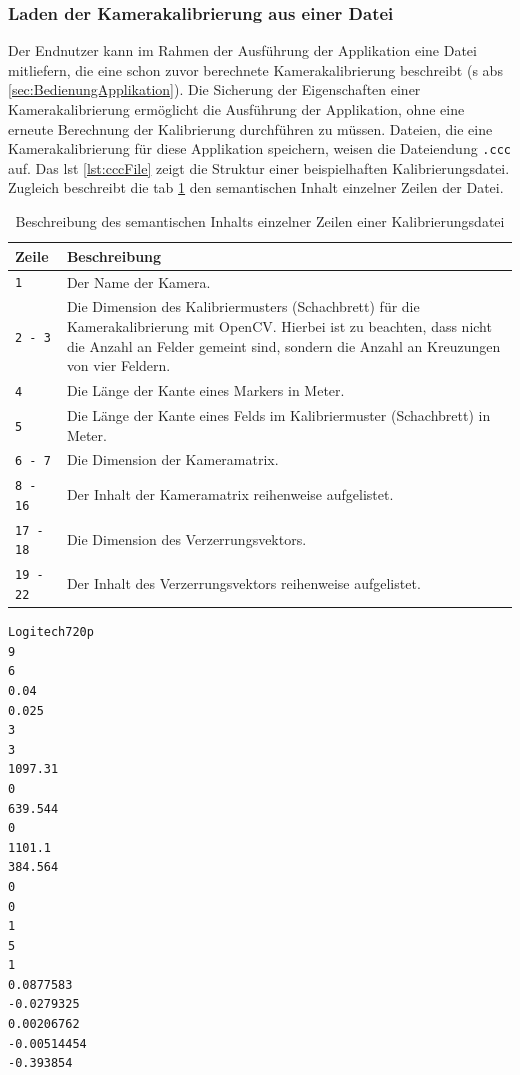 \subsubsection{Laden der Kamerakalibrierung aus einer Datei}\label{sssec:lokalfile}
Der Endnutzer kann im Rahmen der Ausführung der Applikation eine Datei mitliefern, die eine schon zuvor berechnete Kamerakalibrierung beschreibt (\acs{s} \acs{abs} \ref{sec:BedienungApplikation}). Die Sicherung der Eigenschaften einer Kamerakalibrierung ermöglicht die Ausführung der Applikation, ohne eine erneute Berechnung der Kalibrierung durchführen zu müssen. Dateien, die eine Kamerakalibrierung für diese Applikation speichern, weisen die Dateiendung \grqq \texttt{.ccc}\grqq{} auf. Das \acs{lst} \ref{lst:cccFile} zeigt die Struktur einer beispielhaften Kalibrierungsdatei. Zugleich beschreibt die \acs{tab} \ref{tab:cccFile} den semantischen Inhalt einzelner Zeilen der Datei.

\begin{table}[H]
\centering
\begin{tabular}{|p{3cm}|p{12cm}|}
\hline
\textbf{Zeile} & \textbf{Beschreibung} \\
\hline
\verb|1| & Der Name der Kamera.\\
\hline
\verb|2 - 3| & Die Dimension des Kalibriermusters (Schachbrett) für die Kamerakalibrierung mit OpenCV. Hierbei ist zu beachten, dass nicht die Anzahl an Felder gemeint sind, sondern die Anzahl an Kreuzungen von vier Feldern.\\
\hline
\verb|4| & Die Länge der Kante eines Markers in Meter.\\
\hline
\verb|5| & Die Länge der Kante eines Felds im Kalibriermuster (Schachbrett) in Meter.\\
\hline
\verb|6 - 7| & Die Dimension der Kameramatrix.\\
\hline
\verb|8 - 16| & Der Inhalt der Kameramatrix reihenweise aufgelistet.\\
\hline
\verb|17 - 18| & Die Dimension des Verzerrungsvektors.\\
\hline
\verb|19 - 22| & Der Inhalt des Verzerrungsvektors reihenweise aufgelistet.\\
\hline
\end{tabular}
\caption{Beschreibung des semantischen Inhalts einzelner Zeilen einer Kalibrierungsdatei}
\label{tab:cccFile}
\end{table}

\begin{lstlisting}[caption={Struktur einer Datei, die eine Kamerakalibrierung speichert und die Dateiendung \grqq \texttt{.ccc}\grqq{} aufweist}, label={lst:cccFile}]
Logitech720p
9
6
0.04
0.025
3
3
1097.31
0
639.544
0
1101.1
384.564
0
0
1
5
1
0.0877583
-0.0279325
0.00206762
-0.00514454
-0.393854
\end{lstlisting}

